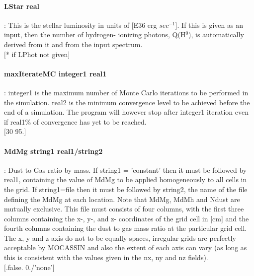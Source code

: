 \documentclass[11pt]{article}
\begin{document}
\paragraph    {LStar real}	     : This is the stellar luminosity in units of [E36 erg $sec^{-1}$].
		     If this is given as an input, then the number of hydrogen-
		     ionizing photons,  Q(H$^0$), is automatically derived from it 
		     and from the input spectrum. \\
		     $[$* if LPhot not given$]$\\

\paragraph    {maxIterateMC integer1 real1}: integer1 is the maximum number of Monte Carlo iterations to 
		     be performed in the simulation. real2 is the minimum convergence level
                     to be achieved before the end of a simulation. The program will however 
		     stop after integer1 iteration even if real1\% of convergence has yet to 
		     be reached.\\
		     $[$30 95.$]$\\

\paragraph    {MdMg string1 real1/string2 }: Dust to Gas ratio by mass. If string1 = 'constant' then
                     it must be followed by real1, containing the value of MdMg to be applied 
                     homogeneously to all cells in the grid. If string1=file then it must be 
                     followed by string2, the name of the file defining the MdMg at each 
                     location. Note that MdMg, MdMh and Ndust are mutually exclusive.
                     This file must consists of four columns, with the first three 
		     columns containing the x-, y-, and z- coordinates of the grid cell in 
		     [cm] and the fourth columns containing the dust to gas mass ratio
                     at the particular grid cell. The 
		     x, y and z axis do not to be equally spaces, irregular grids are 
		     perfectly acceptable by MOCASSIN and also the extent of each axis 
		     can vary (as long as this is consistent with the values given in 
		     the nx, ny and nz fields).\\
		     $[$.false. 0./'none'$]$\\
\end{document}
